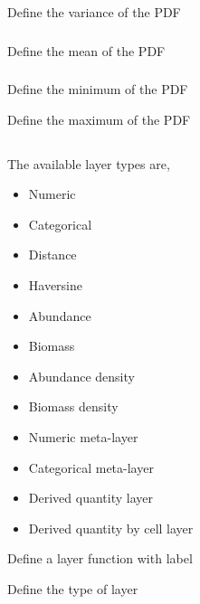  {Define the variance of the PDF}

\subsubsection[Exponential]{}

 {Define the mean of the PDF}

\subsubsection[Uniform]{}

 {Define the minimum of the PDF}

 {Define the maximum of the PDF}

\subsection{}

The available layer types  are,

\begin{itemize}
	\item Numeric
	\item Categorical
	\item Distance
	\item Haversine
	\item Abundance
	\item Biomass
	\item Abundance density
	\item Biomass density
	\item Numeric meta-layer
	\item Categorical meta-layer
	\item Derived quantity layer
	\item Derived quantity by cell layer
\end{itemize}

 {Define a layer function with label}

 {Define the type of layer}


